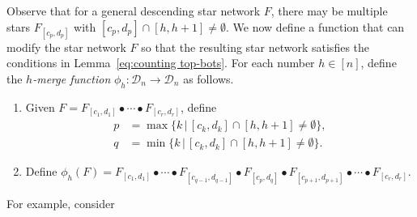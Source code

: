 \documentclass[12pt]{amsart}
\theoremstyle{definition}
\numberwithin{equation}{section}
\newcommand{\D}{\mathcal{D}}
\begin{document}
Observe that for a general descending star network $F$, there may be multiple stars $F_{[c_p,d_p]}$ with $[c_p, d_p]\cap[h, h+1]\neq \emptyset$. We now define a function that can modify the star network $F$ so that the resulting star network satisfies the conditions in Lemma~\ref{eq:counting top-bots}. For each number $h \in [n]$, define the \emph{$h$-merge function}
$\phi_h: \D_n \rightarrow \D_n$ as follows.

\begin{enumerate}
\item Given $F = F_{[c_1,d_1]} \bullet \cdots \bullet F_{[c_r,d_r]}$, define
  \begin{equation*}
    \begin{aligned}
      p &= \max \{k \,|\, [c_k,d_k] \cap [h,h+1] \neq \emptyset \},\\
      q &= \min \{k \,|\, [c_k,d_k] \cap [h,h+1] \neq \emptyset \}.
    \end{aligned}
  \end{equation*}
\item Define $\phi_h(F) = F_{[c_1,d_1]} \bullet \cdots \bullet F_{[c_{q-1},d_{q-1}]} \bullet F_{[c_p,d_q]} \bullet F_{[c_{p+1},d_{p+1}]} \bullet \cdots \bullet F_{[c_r,d_r]}$.
\end{enumerate}

For example, consider
\end{document}
